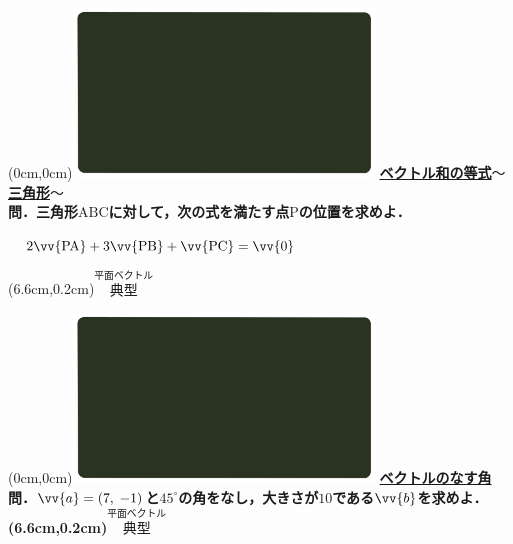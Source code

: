 \documentclass[10pt,
fleqn,
dvipdfmx,
uplatex
]{jsarticle}
\begin{document}
\newpage


\at(0cm,0cm){\includegraphics[width=8cm,bb=0 0 1920 1080]{./media_local/smart_background/平面ベクトル.jpeg}}
{\color{orange}\bf\boldmath\Large\underline{ベクトル和の等式$〜$三角形$〜$}}\vspace{0.3zw}\\
\Large 
\bf\boldmath 問．三角形$\text{ABC}$に対して，次の式を満たす点$\text{P}$の位置を求めよ．
\vspace{0.8zw}

\LARGE
\ \ $2\vv {\text{PA}}+3\vv {\text{PB}}+\vv {\text{PC}}=\vv {0}$


\at(6.6cm,0.2cm){\small\color{bradorange}$\overset{\text{平面ベクトル}}{\text{典型}}$}


\newpage



\at(0cm,0cm){\includegraphics[width=8cm,bb=0 0 1920 1080]{./media_local/smart_background/平面ベクトル.jpeg}}
{\color{orange}\bf\boldmath\LARGE\underline{ベクトルのなす角}}\vspace{0.3zw}\\
\LARGE 
\bf\boldmath 問．$\vv {a}=\left(7,\;-1\right)$と${45}^\circ$の角をなし，大きさが${10}$である$\vv {b}$を求めよ．
\at(6.6cm,0.2cm){\small\color{bradorange}$\overset{\text{平面ベクトル}}{\text{典型}}$}


\newpage
\end{document}
